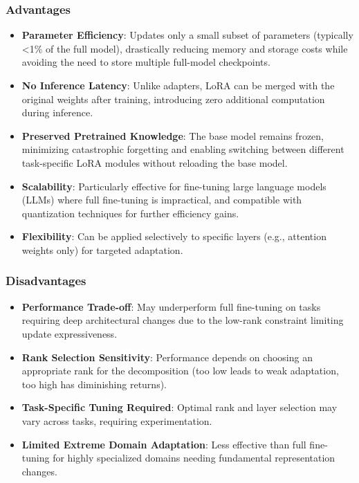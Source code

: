 \subsubsection{Advantages}
\begin{itemize}
    \item \textbf{Parameter Efficiency}: Updates only a small subset of parameters (typically <1\% of the full model), drastically reducing memory and storage costs while avoiding the need to store multiple full-model checkpoints.
    
    \item \textbf{No Inference Latency}: Unlike adapters, LoRA can be merged with the original weights after training, introducing zero additional computation during inference.
    
    \item \textbf{Preserved Pretrained Knowledge}: The base model remains frozen, minimizing catastrophic forgetting and enabling switching between different task-specific LoRA modules without reloading the base model.
    
    \item \textbf{Scalability}: Particularly effective for fine-tuning large language models (LLMs) where full fine-tuning is impractical, and compatible with quantization techniques for further efficiency gains.
    
    \item \textbf{Flexibility}: Can be applied selectively to specific layers (e.g., attention weights only) for targeted adaptation.
\end{itemize}

\subsubsection{Disadvantages}
\begin{itemize}
    \item \textbf{Performance Trade-off}: May underperform full fine-tuning on tasks requiring deep architectural changes due to the low-rank constraint limiting update expressiveness.
    
    \item \textbf{Rank Selection Sensitivity}: Performance depends on choosing an appropriate rank for the decomposition (too low leads to weak adaptation, too high has diminishing returns).
    
    \item \textbf{Task-Specific Tuning Required}: Optimal rank and layer selection may vary across tasks, requiring experimentation.
    
    \item \textbf{Limited Extreme Domain Adaptation}: Less effective than full fine-tuning for highly specialized domains needing fundamental representation changes.
\end{itemize}

